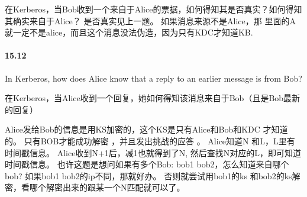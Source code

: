 \documentclass[UTF8]{article}
\begin{document}
在Kerberos，当Bob收到一个来自于Alice的票据，如何得知其是否真实？如何得知其确实来自于Alice？
是否真实见上一题。
如果消息来源不是Alice，那  里面的A就一定不是alice，而且这个消息没法伪造，因为只有KDC才知道KB.

\paragraph{15.12}
In Kerberos, how does Alice know that a reply to an earlier message is from Bob?

在Kerberos，当Alice收到一个回复，她如何得知该消息来自于Bob（且是Bob最新的回复）
 
Alice发给Bob的信息是用KS加密的，这个KS是只有Alice和Bob和KDC 才知道的。 只有BOB才能成功解密 ，并且发出挑战的应答 。
Alice知道N 和L，L里有时间戳信息。  Alice收到N+1后，减1也就得到了N, 然后查找N对应的L，即可知道时间戳信息。
也许这题是想问如果有多个Bob: bob1 bob2，怎么知道来自哪个bob?
如果bob1 bob2的ip不同，那就好办。
否则就尝试用bob1的ks 和bob2的ks解密，看哪个解密出来的跟某一个N匹配就可以了。
\end{document}
